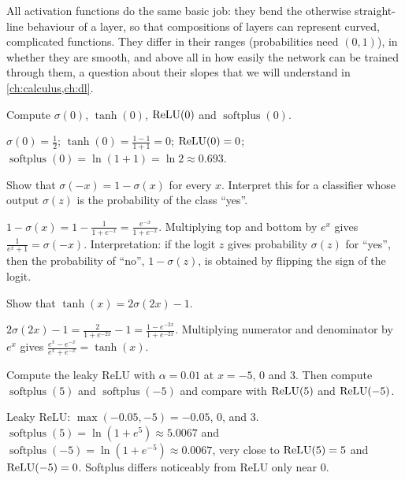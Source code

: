 \begin{mlnote}
All activation functions do the same basic job: they bend the otherwise
straight-line behaviour of a layer, so that compositions of layers can
represent curved, complicated functions. They differ in their ranges
(probabilities need $(0,1)$), in whether they are smooth, and above all in how
easily the network can be trained through them, a question about their
slopes that we will understand in \cref{ch:calculus,ch:dl}.
\end{mlnote}

\sectionexercises

\begin{exercise}
Compute $\sigma(0)$, $\tanh(0)$, $\operatorname{ReLU}(0)$ and $\operatorname{softplus}(0)$.
\end{exercise}
\begin{solution}
$\sigma(0) = \tfrac12$; $\tanh(0) = \tfrac{1 - 1}{1 + 1} = 0$; $\operatorname{ReLU}(0) = 0$;
$\operatorname{softplus}(0) = \ln(1 + 1) = \ln 2 \approx 0.693$.
\end{solution}

\begin{exercise}
Show that $\sigma(-x) = 1 - \sigma(x)$ for every $x$. Interpret this for a
classifier whose output $\sigma(z)$ is the probability of the class ``yes''.
\end{exercise}
\begin{solution}
$1 - \sigma(x) = 1 - \frac{1}{1 + e^{-x}} = \frac{e^{-x}}{1 + e^{-x}}$.
Multiplying top and bottom by $e^x$ gives $\frac{1}{e^{x} + 1} = \sigma(-x)$.
Interpretation: if the logit $z$ gives probability $\sigma(z)$ for ``yes'', then
the probability of ``no'', $1 - \sigma(z)$, is obtained by flipping the sign of
the logit.
\end{solution}

\begin{exercise}
Show that $\tanh(x) = 2\sigma(2x) - 1$.
\end{exercise}
\begin{solution}
$2\sigma(2x) - 1 = \frac{2}{1 + e^{-2x}} - 1 = \frac{1 - e^{-2x}}{1 + e^{-2x}}$.
Multiplying numerator and denominator by $e^{x}$ gives
$\frac{e^x - e^{-x}}{e^x + e^{-x}} = \tanh(x)$.
\end{solution}

\begin{exercise}
Compute the leaky ReLU with $\alpha = 0.01$ at $x = -5$, $0$ and $3$. Then
compute $\operatorname{softplus}(5)$ and $\operatorname{softplus}(-5)$ and compare
with $\operatorname{ReLU}(5)$ and $\operatorname{ReLU}(-5)$.
\end{exercise}
\begin{solution}
Leaky ReLU: $\max(-0.05, -5) = -0.05$, $0$, and $3$.
$\operatorname{softplus}(5) = \ln(1 + e^5) \approx 5.0067$ and
$\operatorname{softplus}(-5) = \ln(1 + e^{-5}) \approx 0.0067$, very close to
$\operatorname{ReLU}(5) = 5$ and $\operatorname{ReLU}(-5) = 0$. Softplus differs noticeably from ReLU only
near $0$.
\end{solution}

